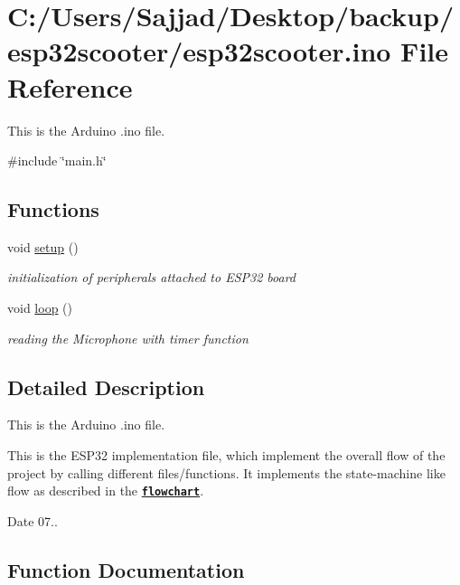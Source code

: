 \hypertarget{esp32scooter_8ino}{}\section{C\+:/\+Users/\+Sajjad/\+Desktop/backup/esp32scooter/esp32scooter.ino File Reference}
\label{esp32scooter_8ino}


This is the Arduino .ino file.  


{\ttfamily \#include \char`\"{}main.\+h\char`\"{}}\newline
\subsection*{Functions}
\begin{DoxyCompactItemize}
\item 
void \mbox{\hyperlink{esp32scooter_8ino_a4fc01d736fe50cf5b977f755b675f11d}{setup}} ()
\begin{DoxyCompactList}\small\item\em initialization of peripherals attached to E\+S\+P32 board \end{DoxyCompactList}\item 
void \mbox{\hyperlink{esp32scooter_8ino_afe461d27b9c48d5921c00d521181f12f}{loop}} ()
\begin{DoxyCompactList}\small\item\em reading the Microphone with timer function \end{DoxyCompactList}\end{DoxyCompactItemize}


\subsection{Detailed Description}
This is the Arduino .ino file. 

This is the E\+S\+P32 implementation file, which implement the overall flow of the project by calling different files/functions. It implements the state-\/machine like flow as described in the \href{StatemachineFlow.pdf}{\texttt{ {\bfseries{flowchart}}}}.

\begin{DoxyDate}{Date}
07.. 
\end{DoxyDate}


\subsection{Function Documentation}
\mbox{\label{esp32scooter_8ino_afe461d27b9c48d5921c00d521181f12f}} 
